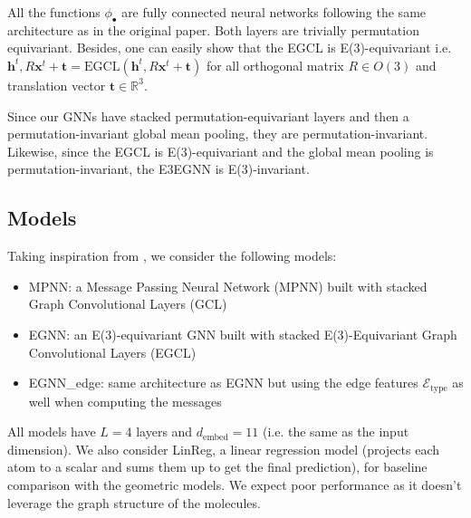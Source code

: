 \documentclass[sigconf]{acmart}
\begin{document}
All the functions $\phi_\bullet$ are fully connected neural networks following the same architecture as in the original paper.
Both layers are trivially permutation equivariant. Besides, one can easily show that the EGCL is E(3)-equivariant 
i.e. $\mathbf{h}^t, R\mathbf{x}^t + \mathbf{t} = \text{EGCL}(\mathbf{h}^t, R\mathbf{x}^t + \mathbf{t})$ 
for all orthogonal matrix $R\in O(3)$ and translation vector $\mathbf{t} \in \mathbb{R}^3$.

Since our GNNs have stacked permutation-equivariant layers and then a permutation-invariant global mean pooling, they are permutation-invariant.
Likewise, since the EGCL is E(3)-equivariant and the global mean pooling is permutation-invariant, the E3EGNN is E(3)-invariant.


\subsection{Models}

Taking inspiration from \cite{gnn-101}, we consider the following models:
\begin{itemize}
    \item MPNN: a Message Passing Neural Network (MPNN) built with stacked Graph Convolutional Layers (GCL)
    \item EGNN: an E(3)-equivariant GNN built with stacked E(3)-Equivariant Graph Convolutional Layers (EGCL)
    \item EGNN\_edge: same architecture as EGNN but using the edge features $\mathcal{E}_\text{type}$ as well when computing the messages
\end{itemize}
All models have $L=4$ layers and $d_\text{embed}=11$ (i.e. the same as the input dimension).
We also consider LinReg, a linear regression model (projects each atom to a scalar and sums them up to get the final prediction), for baseline comparison with the geometric models.
We expect poor performance as it doesn't leverage the graph structure of the molecules.

\begin{table}[h!]
\centering
{}
\caption{Symmetry Properties of the Different Models}
\end{table}
\end{document}
